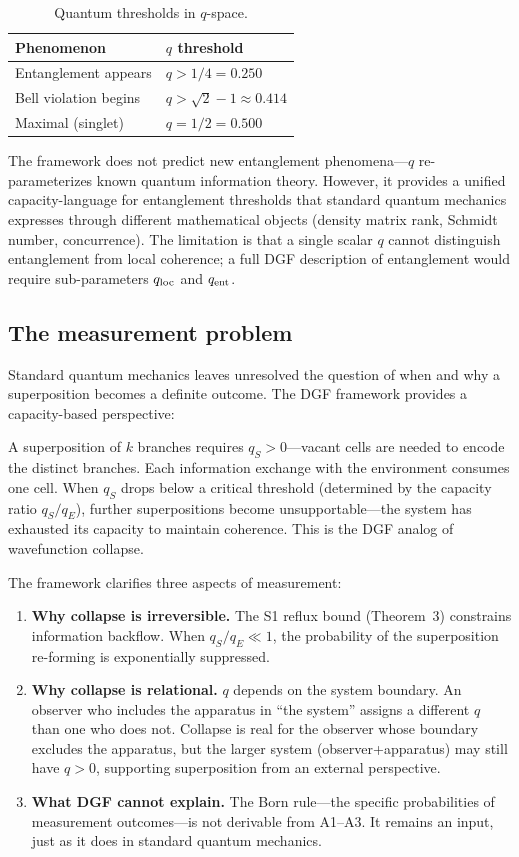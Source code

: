 \documentclass[12pt]{article}
\begin{document}
\begin{table}[h]
\caption{Quantum thresholds in $q$-space.}
\begin{tabular}{ll}
\toprule
Phenomenon & $q$ threshold \\
\midrule
Entanglement appears & $q > 1/4 = 0.250$ \\
Bell violation begins & $q > \sqrt{2}-1 \approx 0.414$ \\
Maximal (singlet) & $q = 1/2 = 0.500$ \\
\bottomrule
\end{tabular}
\end{table}

The framework does not predict new entanglement phenomena---$q$ re-parameterizes known quantum information theory. However, it provides a unified capacity-language for entanglement thresholds that standard quantum mechanics expresses through different mathematical objects (density matrix rank, Schmidt number, concurrence). The limitation is that a single scalar $q$ cannot distinguish entanglement from local coherence; a full DGF description of entanglement would require sub-parameters $q_{\rm loc}$ and $q_{\rm ent}$.

\subsection{The measurement problem}

Standard quantum mechanics leaves unresolved the question of when and why a superposition becomes a definite outcome. The DGF framework provides a capacity-based perspective:

A superposition of $k$ branches requires $q_S > 0$---vacant cells are needed to encode the distinct branches. Each information exchange with the environment consumes one cell. When $q_S$ drops below a critical threshold (determined by the capacity ratio $q_S/q_E$), further superpositions become unsupportable---the system has exhausted its capacity to maintain coherence. This is the DGF analog of wavefunction collapse.

The framework clarifies three aspects of measurement:
\begin{enumerate}
\item \textbf{Why collapse is irreversible.} The S1 reflux bound (Theorem~3) constrains information backflow. When $q_S/q_E\ll 1$, the probability of the superposition re-forming is exponentially suppressed.
\item \textbf{Why collapse is relational.} $q$ depends on the system boundary. An observer who includes the apparatus in ``the system'' assigns a different $q$ than one who does not. Collapse is real for the observer whose boundary excludes the apparatus, but the larger system (observer+apparatus) may still have $q>0$, supporting superposition from an external perspective.
\item \textbf{What DGF cannot explain.} The Born rule---the specific probabilities of measurement outcomes---is not derivable from A1--A3. It remains an input, just as it does in standard quantum mechanics.
\end{enumerate}
\end{document}
